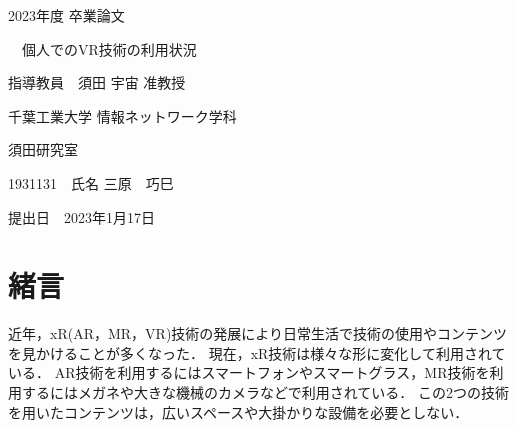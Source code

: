 \documentclass[12pt,a4j]{ltjsarticle}
\begin{document}
 

\begin{titlepage}
 \begin{center}
  
    \vspace*{20truept}
    
    {\LARGE 2023年度 卒業論文} 
    
    \vspace*{75truept}
    
    {\Huge }　個人でのVR技術の利用状況
    
    \vspace{85truept}
    
    {\LARGE 指導教員　須田 宇宙 准教授}
    
    \vspace{60truept}
    
    {\LARGE 千葉工業大学 情報ネットワーク学科}
    
    \vspace{15truept}
    
    {\LARGE 須田研究室}
    
    \vspace{70truept}
    
    {\LARGE 1931131　氏名 三原　巧巳 }　%

    \vspace{70truept}
    
  \end{center}
  \begin{flushright}

    {\LARGE 提出日　2023年1月17日}
  
  \end{flushright}
\end{titlepage}

\setcounter{tocdepth}{3}
\tableofcontents
\listoftables
\listoffigures
\clearpage
{}
\setcounter{page}{1}



\section{緒言}
近年，xR(AR，MR，VR)技術の発展により日常生活で技術の使用やコンテンツを見かけることが多くなった．
現在，xR技術は様々な形に変化して利用されている．
AR技術を利用するにはスマートフォンやスマートグラス，MR技術を利用するにはメガネや大きな機械のカメラなどで利用されている．
この2つの技術を用いたコンテンツは，広いスペースや大掛かりな設備を必要としない．
\end{document}
